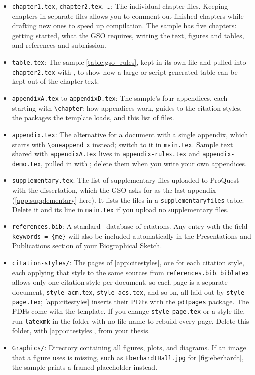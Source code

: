 \begin{itemize}
  \item \texttt{chapter1.tex}, \texttt{chapter2.tex}, \ldots: The individual chapter files. Keeping chapters in separate files allows you to comment out finished chapters while drafting new ones to speed up compilation. The sample has five chapters: getting started, what the GSO requires, writing the text, figures and tables, and references and submission.

  \item \texttt{table.tex}: The sample \cref{table:gso_rules}, kept in its own file and pulled into \texttt{chapter2.tex} with \verb++, to show how a large or script-generated table can be kept out of the chapter text.

  \item \texttt{appendixA.tex} to \texttt{appendixD.tex}: The sample's four appendices, each starting with \verb+\chapter+: how appendices work, guides to the citation styles, the packages the template loads, and this list of files.

  \item \texttt{appendix.tex}: The alternative for a document with a single appendix, which starts with \verb+\oneappendix+ instead; switch to it in \texttt{main.tex}. Sample text shared with \texttt{appendixA.tex} lives in \texttt{appendix-rules.tex} and \texttt{appendix-demo.tex}, pulled in with \verb++; delete them when you write your own appendices.

  \item \texttt{supplementary.tex}: The list of supplementary files uploaded to ProQuest with the dissertation, which the GSO asks for as the last appendix (\cref{app:supplementary} here). It lists the files in a \texttt{supplementaryfiles} table. Delete it and its \verb++ line in \texttt{main.tex} if you upload no supplementary files.

  \item \texttt{references.bib}: A standard \BibTeX\ database of citations. Any entry with the field \verb+keywords = {me}+ will also be included automatically in the Presentations and Publications section of your Biographical Sketch.

  \item \texttt{citation-styles/}: The pages of \cref{app:citestyles}, one for each citation style, each applying that style to the same sources from \texttt{references.bib}. \texttt{biblatex} allows only one citation style per document, so each page is a separate document, \texttt{style-acm.tex}, \texttt{style-acs.tex}, and so on, all laid out by \texttt{style-page.tex}; \cref{app:citestyles} inserts their PDFs with the \texttt{pdfpages} package. The PDFs come with the template. If you change \texttt{style-page.tex} or a style file, run \texttt{latexmk} in the folder with no file name to rebuild every page. Delete this folder, with \cref{app:citestyles}, from your thesis.

  \item \texttt{Graphics/}: Directory containing all figures, plots, and diagrams. If an image that a figure uses is missing, such as \texttt{EberhardtHall.jpg} for \cref{fig:eberhardt}, the sample prints a framed placeholder instead.
\end{itemize}
